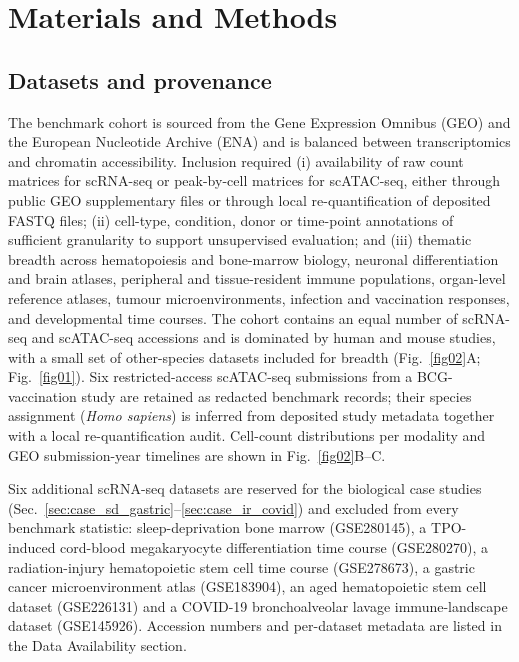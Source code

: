 \documentclass[referee, pdflatex, sn-vancouver-num]{sn-jnl}
\begin{document}
\section{Materials and Methods}

\subsection{Datasets and provenance}\label{sec:bench_comp}

The benchmark cohort is sourced from the Gene Expression Omnibus (GEO) and the European Nucleotide Archive (ENA) and is balanced between transcriptomics and chromatin accessibility. Inclusion required (i) availability of raw count matrices for scRNA-seq or peak-by-cell matrices for scATAC-seq, either through public GEO supplementary files or through local re-quantification of deposited FASTQ files; (ii) cell-type, condition, donor or time-point annotations of sufficient granularity to support unsupervised evaluation; and (iii) thematic breadth across hematopoiesis and bone-marrow biology, neuronal differentiation and brain atlases, peripheral and tissue-resident immune populations, organ-level reference atlases, tumour microenvironments, infection and vaccination responses, and developmental time courses. The cohort contains an equal number of scRNA-seq and scATAC-seq accessions and is dominated by human and mouse studies, with a small set of other-species datasets included for breadth (Fig.~\ref{fig02}A; Fig.~\ref{fig01}). Six restricted-access scATAC-seq submissions from a BCG-vaccination study are retained as redacted benchmark records; their species assignment (\textit{Homo sapiens}) is inferred from deposited study metadata together with a local re-quantification audit. Cell-count distributions per modality and GEO submission-year timelines are shown in Fig.~\ref{fig02}B--C.

Six additional scRNA-seq datasets are reserved for the biological case studies (Sec.~\ref{sec:case_sd_gastric}--\ref{sec:case_ir_covid}) and excluded from every benchmark statistic: sleep-deprivation bone marrow (GSE280145), a TPO-induced cord-blood megakaryocyte differentiation time course (GSE280270), a radiation-injury hematopoietic stem cell time course (GSE278673), a gastric cancer microenvironment atlas (GSE183904), an aged hematopoietic stem cell dataset (GSE226131) and a COVID-19 bronchoalveolar lavage immune-landscape dataset (GSE145926). Accession numbers and per-dataset metadata are listed in the Data Availability section.
\end{document}
